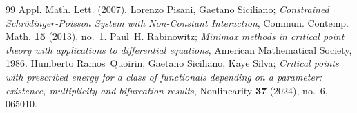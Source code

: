 \documentclass[10pt,a4paper]{amsart}
\numberwithin{equation}{section}
\begin{document}
\begin{thebibliography}{99}
 Appl. Math. Lett. (2007).
 Lorenzo Pisani, Gaetano Siciliano;
\emph{{C}onstrained {S}chr\"odinger-{P}oisson {S}ystem with
 {N}on-{C}onstant {I}nteraction}, Commun. Contemp. Math. \textbf{15} (2013),
 no.~1.
 Paul~H. Rabinowitz;
\emph{Minimax methods in critical point theory with
 applications to differential equations}, American Mathematical Society, 1986.
 Humberto Ramos~Quoirin, Gaetano Siciliano, Kaye Silva;
\emph{Critical points with prescribed energy for a class of functionals depending on a
 parameter: existence, multiplicity and bifurcation results}, Nonlinearity
 \textbf{37} (2024), no.~6, 065010.
\end{thebibliography}
\end{document}
